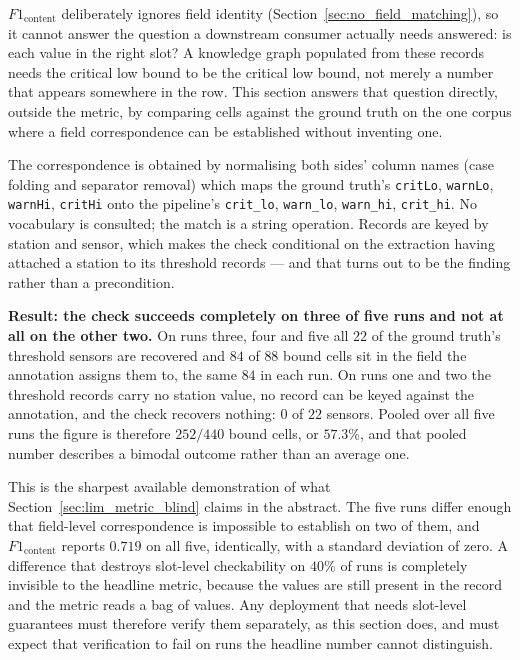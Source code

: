 \documentclass[11pt]{article}
\begin{document}
$F1_{\text{content}}$ deliberately ignores field identity
(Section~\ref{sec:no_field_matching}), so it cannot answer the question a
downstream consumer actually needs answered: is each value in the right slot? A
knowledge graph populated from these records needs the critical low bound to be
the critical low bound, not merely a number that appears somewhere in the row.
This section answers that question directly, outside the metric, by comparing
cells against the ground truth on the one corpus where a field correspondence can
be established without inventing one.

The correspondence is obtained by normalising both sides' column names (case
folding and separator removal) which maps the ground truth's \texttt{critLo},
\texttt{warnLo}, \texttt{warnHi}, \texttt{critHi} onto the pipeline's
\texttt{crit\_lo}, \texttt{warn\_lo}, \texttt{warn\_hi}, \texttt{crit\_hi}. No
vocabulary is consulted; the match is a string operation. Records are keyed by
station and sensor, which makes the check conditional on the extraction having
attached a station to its threshold records --- and that turns out to be the
finding rather than a precondition.

\textbf{Result: the check succeeds completely on three of five runs and not at
all on the other two.} On runs three, four and five all $22$ of the ground
truth's threshold sensors are recovered and $84$ of $88$ bound cells sit in the
field the annotation assigns them to, the same $84$ in each run. On runs one and
two the threshold records carry no station value, no record can be keyed against
the annotation, and the check recovers nothing: $0$ of $22$ sensors. Pooled over
all five runs the figure is therefore $252/440$ bound cells, or $57.3\%$, and
that pooled number describes a bimodal outcome rather than an average one.

This is the sharpest available demonstration of what
Section~\ref{sec:lim_metric_blind} claims in the abstract. The five runs differ
enough that field-level correspondence is impossible to establish on two of
them, and $F1_{\text{content}}$ reports $0.719$ on all five, identically, with a
standard deviation of zero. A difference that destroys slot-level checkability
on $40\%$ of runs is completely invisible to the headline metric, because the
values are still present in the record and the metric reads a bag of values. Any
deployment that needs slot-level guarantees must therefore verify them
separately, as this section does, and must expect that verification to fail on
runs the headline number cannot distinguish.
\end{document}
